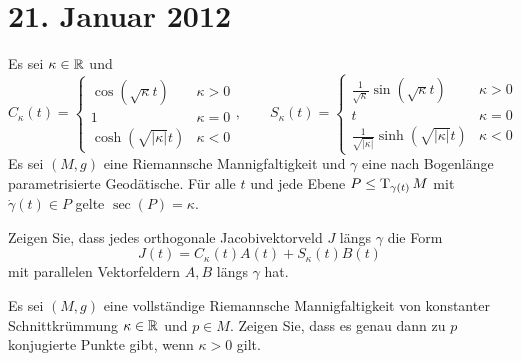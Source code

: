 \section{21. Januar 2012}
\setcounter{Aufg}{0} %
\setcounter{Loes}{0}

\begin{Aufg}
Es sei $\kappa \in \operatorname{\mathbb{R}}$ und \[C_\kappa(t)=\begin{cases}\cos(\sqrt{\kappa} t )&\kappa>0\\ 1 & \kappa=0\\ \cosh(\sqrt{|\kappa|} t)& \kappa <0\end{cases}, \qquad S_\kappa (t)=\begin{cases}\frac{1}{\sqrt{\kappa}}\sin(\sqrt{\kappa} t )&\kappa>0\\ t & \kappa=0\\ \frac{1}{\sqrt{|\kappa|}}\sinh(\sqrt{|\kappa|} t)& \kappa <0\end{cases} \]
Es sei $(M,g)$ eine Riemannsche Mannigfaltigkeit und $\gamma$ eine nach Bogenlänge parametrisierte Geodätische. Für alle $t$ und jede Ebene $P \leq \operatorname{T}_{\gamma(t)} M$ mit $\dot{\gamma}(t) \in P$ gelte $\sec(P)=\kappa$. 

Zeigen Sie, dass jedes orthogonale Jacobivektorveld $J$ längs $\gamma$ die Form \[J(t)=C_\kappa(t) A(t) + S_\kappa(t)B(t)\] mit parallelen Vektorfeldern $A,B$ längs $\gamma$ hat.
\end{Aufg}

\begin{Aufg}
Es sei $(M,g)$ eine vollständige Riemannsche Mannigfaltigkeit von konstanter Schnittkrümmung $\kappa \in \operatorname{\mathbb{R}}$ und $p \in M$. Zeigen Sie, dass es genau dann zu $p$ konjugierte Punkte gibt, wenn $\kappa >0$ gilt.
\end{Aufg}


